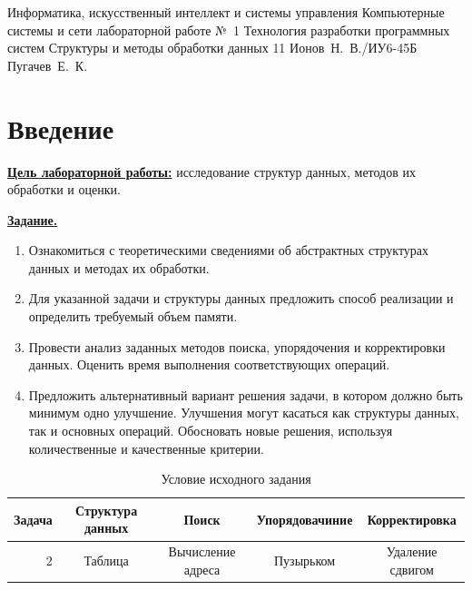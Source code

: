 \documentclass{bmstu}
\begin{document}
    \makereporttitle
    {Информатика, искусственный интеллект и системы управления} %
    {Компьютерные системы и сети} %
    {лабораторной работе №~1} %
    {Технология разработки программных систем} %
    {Структуры и методы обработки данных} %
    {11} %
    {Ионов~Н.~В./ИУ6-45Б} %
    {Пугачев~Е.~К.} %
    
    \chapter{Введение}

    \underline{\textbf{Цель лабораторной работы:}} исследование структур данных, методов их обработки и оценки.
    \vspace{8pt}

    \underline{\textbf{Задание.}}
    \begin{enumerate}
        \item Ознакомиться с теоретическими сведениями об абстрактных структурах данных и методах их обработки. 
        \item Для указанной задачи и структуры данных предложить способ реализации и определить требуемый объем памяти.
        \item Провести анализ заданных  методов поиска, упорядочения  и корректировки  данных.  Оценить  время  выполнения  соответствующих операций. 
        \item Предложить альтернативный вариант решения задачи, в котором должно  быть  минимум одно  улучшение. Улучшения  могут касаться  как  структуры  данных,  так  и  основных  операций.  Обосновать новые решения, используя количественные и качественные критерии.
    \end{enumerate}
    
    \begin{table}[H]
        \centering
        \small
        \begin{tabular}{|r|*{4}{c|}}
            \hline
            Задача & Структура данных & Поиск & Упорядовачиние & Корректировка \\
            \hline
            2 & Таблица & Вычисление адреса & Пузырьком & Удаление сдвигом \\
            \hline
        \end{tabular}
        \caption{Условие исходного задания}
    \end{table}
\end{document}
